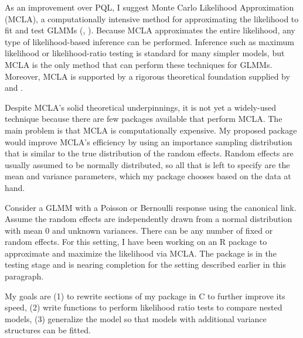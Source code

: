 \documentclass[12pt]{article}
\newcommand{\ncite}[1]{\citeauthor{#1}, \citeyear{#1}}
\begin{document}
As an improvement over PQL, I suggest  Monte Carlo  Likelihood Approximation (MCLA), a computationally intensive method for approximating the likelihood to fit and test GLMMs (\ncite{geyer:thom:1992}).   Because MCLA approximates the entire likelihood, any type of likelihood-based inference can be performed.  Inference such as maximum likelihood or likelihood-ratio testing is standard for many simpler models, but MCLA is the only method that can perform these techniques for GLMMs.  Moreover, MCLA is supported by a rigorous theoretical foundation supplied by \citet{geyer:1994} and  \citet{sung:geyer:2007}. 




Despite MCLA's solid theoretical underpinnings, it is not yet a widely-used technique because there are  few packages available that perform MCLA.  The main problem is that MCLA is  computationally expensive. My proposed package would improve MCLA's efficiency by using an importance sampling distribution that is similar to the true distribution of the random effects.  Random effects are usually assumed to be normally distributed, so all that is left to specify are the mean and variance parameters, which my  package chooses  based on the data at hand.
 




Consider a GLMM with a Poisson or Bernoulli response using the canonical link.  Assume the random effects are independently drawn from a normal distribution with mean 0 and unknown variances. There can be any number of fixed or random effects.  For this setting, I have been working on an R package to approximate and maximize the likelihood via MCLA.   The package is in the testing stage and is nearing completion for the setting described earlier in this paragraph.  




My goals are  (1) to rewrite sections of my package in C to further improve its speed, (2) write functions to perform likelihood ratio tests to compare nested models, (3) generalize the model so that models with additional variance structures can be fitted.
\end{document}
